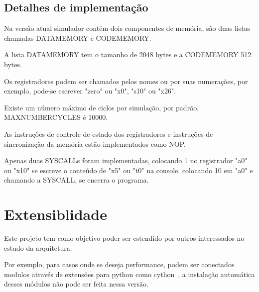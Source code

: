 	\subsection{Detalhes de implementação}
		Na versão atual simulador contém dois componentes de memória, são duas listas chamadas DATA\textunderscore MEMORY e CODE\textunderscore MEMORY.

		A lista DATA\textunderscore MEMORY tem o tamanho de 2048 bytes e a CODE\textunderscore MEMORY 512 bytes.

		Os registradores podem ser chamados pelos nomes ou por suas numerações, por exemplo, pode-se escrever "zero" ou "x0", "s10" ou "x26".

		Existe um número máximo de ciclos por simulação, por padrão, MAX\textunderscore NUMBER\textunderscore CYCLES é 10000.

		As instruções de controle de estado dos registradores e instruções de sincronização da memória estão implementados como NOP.

		Apenas duas SYSCALLs foram implementadas, colocando 1 no registrador "a0" ou "x10" se escreve o conteúdo de "x5" ou "t0" na console. colocando 10 em "a0" e chamando a SYSCALL, se encerra o programa.

\section{Extensiblidade}

	Este projeto tem como objetivo poder ser estendido por outros interessados no estudo da arquitetura. 

	Por exemplo, para casos onde se deseja performance, podem ser conectados modulos através de extensões para python como cython~\cite{cython_home}, a instalação automática desses módulos não pode ser feita nessa versão.
